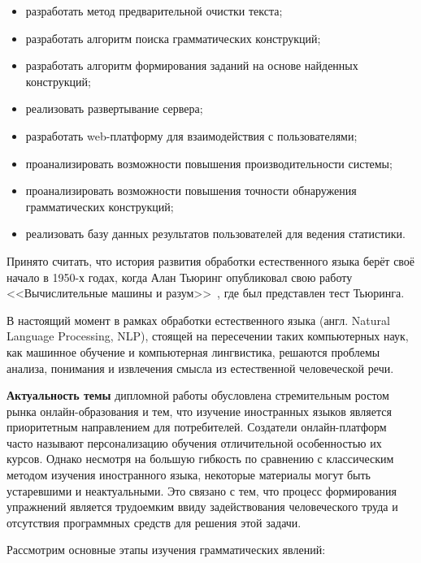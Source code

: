 \begin{itemize}
  \item разработать метод предварительной очистки текста;
  \item разработать алгоритм поиска грамматических конструкций;
  \item разработать алгоритм формирования заданий на основе найденных конструкций;
  \item реализовать развертывание сервера;
  \item разработать web-платформу для взаимодействия с пользователями;
  \item проанализировать возможности повышения производительности системы;
  \item проанализировать возможности повышения точности обнаружения грамматических конструкций;
  \item реализовать базу данных результатов пользователей для ведения статистики.
\end{itemize}

\newpage
\Intro
Принято считать, что история развития обработки естественного языка берёт своё начало в 1950-х годах, когда Алан Тьюринг опубликовал свою работу <<Вычислительные машины и разум>>~\cite{turing1950computing}, где был представлен тест Тьюринга.

В настоящий момент в рамках обработки естественного языка (англ. Natural Language Processing, NLP), стоящей на пересечении таких компьютерных наук, как машинное обучение и компьютерная лингвистика, решаются проблемы анализа, понимания и извлечения смысла из естественной человеческой речи.

\textbf{Актуальность темы} дипломной работы обусловлена стремительным ростом рынка онлайн-образования и тем, что изучение иностранных языков является приоритетным направлением для потребителей.
Создатели онлайн-платформ часто называют персонализацию обучения отличительной особенностью их курсов. Однако несмотря на большую гибкость по сравнению с классическим методом изучения иностранного языка, некоторые материалы могут быть устаревшими и неактуальными. Это связано с тем, что процесс формирования упражнений является трудоемким ввиду задействования человеческого труда и отсутствия программных средств для решения этой задачи.

Рассмотрим основные этапы изучения грамматических явлений:

